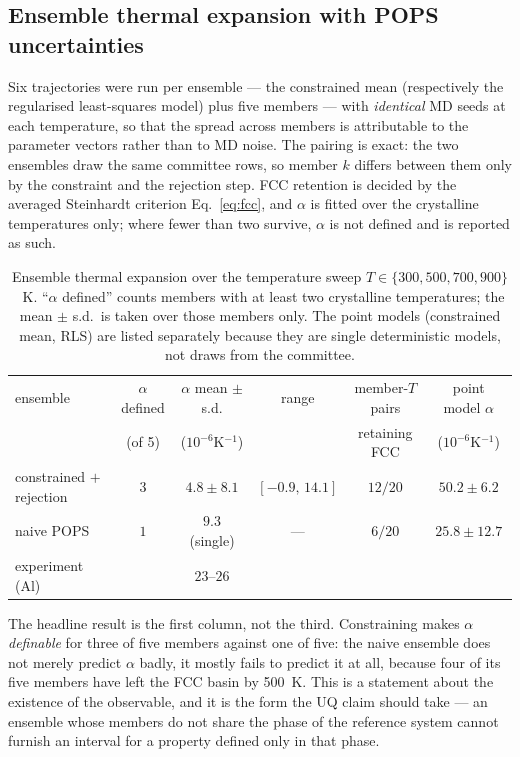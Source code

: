\documentclass{article}
\begin{document}
\subsection{Ensemble thermal expansion with POPS uncertainties}
\label{sec:ensemble alpha}

Six trajectories were run per ensemble --- the constrained mean (respectively the
regularised least-squares model) plus five members --- with \emph{identical} MD
seeds at each temperature, so that the spread across members is attributable to
the parameter vectors rather than to MD noise. The pairing is exact: the two
ensembles draw the same committee rows, so member $k$ differs between them only
by the constraint and the rejection step. FCC retention is decided by the
averaged Steinhardt criterion Eq.~\eqref{eq:fcc}, and $\alpha$ is fitted over the
crystalline temperatures only; where fewer than two survive, $\alpha$ is not
defined and is reported as such.

\begin{table}[h]
\centering
\caption{Ensemble thermal expansion over the temperature sweep
$T\in\{300,500,700,900\}$~K. ``$\alpha$ defined'' counts members with at least
two crystalline temperatures; the mean $\pm$ s.d.\ is taken over those members
only. The point models (constrained mean, RLS) are listed separately because
they are single deterministic models, not draws from the committee.}
\begin{tabular}{lccccc}
\toprule
ensemble & $\alpha$ defined & $\alpha$ mean $\pm$ s.d. & range & member-$T$ pairs & point model $\alpha$ \\
         & (of 5)           & ($10^{-6}$K$^{-1}$)      &       & retaining FCC     & ($10^{-6}$K$^{-1}$) \\
\midrule
constrained $+$ rejection & $3$ & $4.8 \pm 8.1$ & $[-0.9,\,14.1]$ & $12/20$ & $50.2 \pm 6.2$ \\
naive POPS                & $1$ & $9.3$ (single) & ---            & $6/20$  & $25.8 \pm 12.7$ \\
\midrule
experiment (Al)           &     & $23$--$26$    &                 &         & \\
\bottomrule
\end{tabular}
\label{tab:ensemble alpha}
\end{table}

The headline result is the first column, not the third. Constraining makes
$\alpha$ \emph{definable} for three of five members against one of five: the
naive ensemble does not merely predict $\alpha$ badly, it mostly fails to
predict it at all, because four of its five members have left the FCC basin by
500~K. This is a statement about the existence of the observable, and it is the
form the UQ claim should take --- an ensemble whose members do not share the
phase of the reference system cannot furnish an interval for a property defined
only in that phase.
\end{document}
